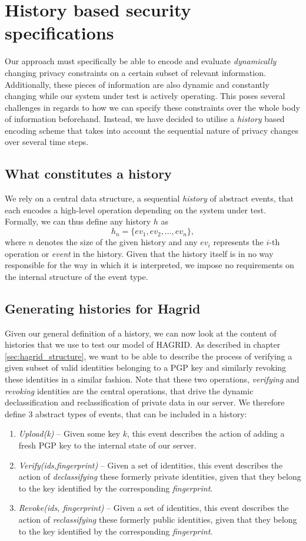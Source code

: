 \section{History based security specifications}
\label{sec:history_def}
Our approach must specifically be able to encode and evaluate \emph{dynamically} changing privacy constraints on a certain subset of relevant information. Additionally, these pieces of information are also dynamic and constantly changing while our system under test is actively operating. This poses several challenges in regards to how we can specify these constraints over the whole body of information beforehand. 
Instead, we have decided to utilise a \emph{history} based encoding scheme that takes into account the sequential nature of privacy changes over several time steps.
\subsection{What constitutes a history}
We rely on a central data structure, a sequential \emph{history} of abstract events, that each encodes a high-level operation depending on the system under test.
Formally, we can thus define any history \(h\) as
\[
    h_n = \{ev_1,ev_2,\dots, ev_n\},
\]
where \(n\) denotes the size of the given history and any \(ev_i\) represents the \(i\)-th operation or \emph{event} in the history.
Given that the history itself is in no way responsible for the way in which it is interpreted, we impose no requirements on the internal structure of the event type.
\subsection{Generating histories for Hagrid}
Given our general definition of a history, we can now look at the content of histories that we use to test our model of HAGRID. 
As described in chapter \ref{sec:hagrid_structure}, we want to be able to describe the process of verifying a given subset of valid identities belonging to a PGP key and similarly revoking these identities in a similar fashion. Note that these two operations, \emph{verifying} and \emph{revoking} identities are the central operations, that drive the dynamic declassification and reclassification of private data in our server.
We therefore define 3 abstract types of events, that can be included in a history: 
\begin{enumerate}
    \item \emph{Upload(k)} -- Given some key \(k\), this event describes the action of adding a fresh PGP key to the internal state of our server.
    \item \emph{Verify(ids,fingerprint)} -- Given a set of identities, this event describes the action of \emph{declassifying} these formerly private identities, given that they belong to the key identified by the corresponding \emph{fingerprint}.
    \item \emph{Revoke(ids, fingerprint)} -- Given a set of identities, this event describes the action of \emph{reclassifying} these formerly public identities, given that they belong to the key identified by the corresponding \emph{fingerprint}.
\end{enumerate}

